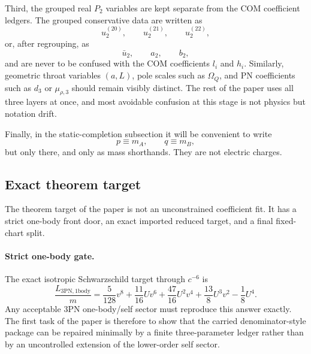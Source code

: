 \documentclass[11pt]{article}
\begin{document}
Third, the grouped real $P_2$ variables are kept separate from the COM
coefficient ledgers.  The grouped conservative data are written as
\[
u_2^{(20)},\qquad u_2^{(21)},\qquad u_2^{(22)},
\]
or, after regrouping, as
\[
\bar u_2,\qquad a_2,\qquad b_2,
\]
and are never to be confused with the COM coefficients $l_i$ and $h_i$.
Similarly, geometric throat variables $(a,L)$, pole scales such as $\Omega_Q$,
and PN coefficients such as $d_3$ or $\mu_{\rho,3}$ should remain visibly
distinct.  The rest of the paper uses all three layers at once, and most
avoidable confusion at this stage is not physics but notation drift.

Finally, in the static-completion subsection it will be convenient to write
\[
p\equiv m_A,
\qquad
q\equiv m_B,
\]
but only there, and only as mass shorthands.  They are not electric charges.

\subsection{Exact theorem target}
\label{sec:dict-target}

The theorem target of the paper is not an unconstrained coefficient fit.  It has
a strict one-body front door, an exact imported reduced target, and a final
fixed-chart split.

\paragraph{Strict one-body gate.}
The exact isotropic Schwarzschild target through $c^{-6}$ is
\[
\frac{L_{3\mathrm{PN},1\mathrm{body}}}{m}
=
\frac5{128}v^8
+\frac{11}{16}Uv^6
+\frac{47}{16}U^2v^4
+\frac{13}{8}U^3v^2
-\frac18U^4.
\]
Any acceptable $3$PN one-body/self sector must reproduce this answer exactly.
The first task of the paper is therefore to show that the carried denominator-style
package can be repaired minimally by a finite three-parameter ledger rather than
by an uncontrolled extension of the lower-order self sector.
\end{document}
